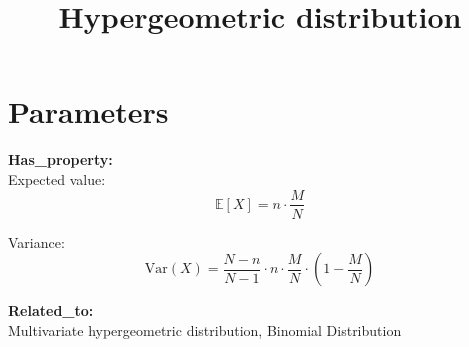 \documentclass{article}
\title{Hypergeometric distribution}
\begin{document}
\maketitle

\section{Parameters}

\textbf{Has\_property:} \\
Expected value: 
\[
\mathbb{E}[X] = n \cdot \frac{M}{N}
\]

Variance:
\[
\text{Var}(X) = \frac{N - n}{N - 1} \cdot n \cdot \frac{M}{N} \cdot \left(1 - \frac{M}{N}\right)
\]

\textbf{Related\_to:} \\
Multivariate hypergeometric distribution, Binomial Distribution
\end{document}
